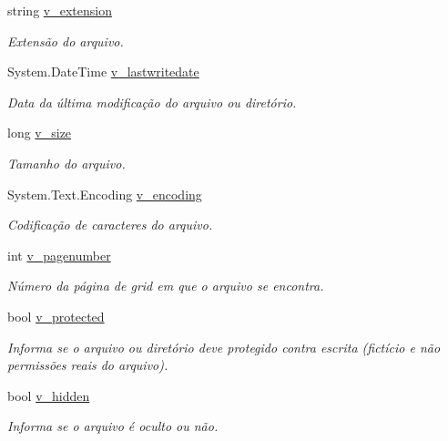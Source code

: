 \begin{DoxyCompactItemize}
string \hyperlink{classSpartacus_1_1Utils_1_1File_a8a2d38a5f48438d53858e6800313d45c}{v\+\_\+extension}
\begin{DoxyCompactList}\small\item\em Extensão do arquivo. \end{DoxyCompactList}\item 
System.\+Date\+Time \hyperlink{classSpartacus_1_1Utils_1_1File_a3ff14b7ecbf2e2b5bb41f44943a18c83}{v\+\_\+lastwritedate}
\begin{DoxyCompactList}\small\item\em Data da última modificação do arquivo ou diretório. \end{DoxyCompactList}\item 
long \hyperlink{classSpartacus_1_1Utils_1_1File_a174b72e731e64d86db44c6d781011137}{v\+\_\+size}
\begin{DoxyCompactList}\small\item\em Tamanho do arquivo. \end{DoxyCompactList}\item 
System.\+Text.\+Encoding \hyperlink{classSpartacus_1_1Utils_1_1File_af7a6fb35b3396d68a88c111ef642ab4f}{v\+\_\+encoding}
\begin{DoxyCompactList}\small\item\em Codificação de caracteres do arquivo. \end{DoxyCompactList}\item 
int \hyperlink{classSpartacus_1_1Utils_1_1File_a02b1d6f67f6718b43807e120244fcf4f}{v\+\_\+pagenumber}
\begin{DoxyCompactList}\small\item\em Número da página de grid em que o arquivo se encontra. \end{DoxyCompactList}\item 
bool \hyperlink{classSpartacus_1_1Utils_1_1File_a5ede704209b7aa9ed88b414629228bd9}{v\+\_\+protected}
\begin{DoxyCompactList}\small\item\em Informa se o arquivo ou diretório deve protegido contra escrita (fictício e não permissões reais do arquivo). \end{DoxyCompactList}\item 
bool \hyperlink{classSpartacus_1_1Utils_1_1File_a33edc75ffa7eab828065c54d645372ea}{v\+\_\+hidden}
\begin{DoxyCompactList}\small\item\em Informa se o arquivo é oculto ou não. \end{DoxyCompactList}\end{DoxyCompactItemize}


